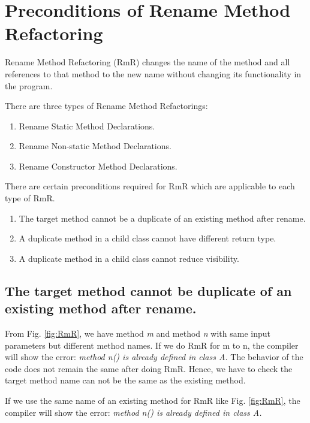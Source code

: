 \section{\textbf{Preconditions of Rename Method Refactoring}}

Rename Method Refactoring (RmR) changes the name of the method and all references to that method to the new name without changing its functionality in the program.

There are three types of Rename Method Refactorings:
\begin{enumerate}
\item Rename Static Method Declarations.
\item Rename Non-static Method Declarations.
\item Rename Constructor Method Declarations.
\end{enumerate}

There are certain preconditions required for RmR which are applicable to each type of RmR.
\begin{enumerate}
	\item The target method cannot be a duplicate of an existing method after rename.
	\item A duplicate method in a child class cannot have different return type.
	\item A duplicate method in a child class cannot reduce visibility.
\end{enumerate}

\subsection {The target method cannot be duplicate of an existing method after rename. }

From Fig. \ref{fig:RmR}, we have method \textsl{m} and method \textsl{n} with same input parameters but different method names. If we do RmR for m to n, the compiler will show the error: \textsl{method n() is already defined in class A.} The behavior of the code does not remain the same after doing RmR. Hence, we have to check the target method name can not be the same as the existing method.

If we use the same name of an existing method for RmR like Fig. \ref{fig:RmR}, the compiler will show the error: \textsl{method n() is already defined in class A.}

